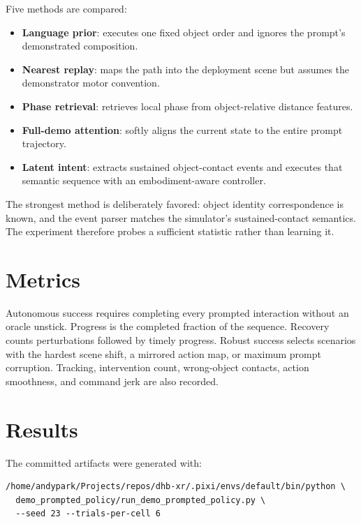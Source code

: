 \documentclass[11pt]{article}
\begin{document}
Five methods are compared:
\begin{itemize}[leftmargin=1.5em]
  \item \textbf{Language prior}: executes one fixed object order and ignores the prompt's demonstrated composition.
  \item \textbf{Nearest replay}: maps the path into the deployment scene but assumes the demonstrator motor convention.
  \item \textbf{Phase retrieval}: retrieves local phase from object-relative distance features.
  \item \textbf{Full-demo attention}: softly aligns the current state to the entire prompt trajectory.
  \item \textbf{Latent intent}: extracts sustained object-contact events and executes that semantic sequence with an embodiment-aware controller.
\end{itemize}

The strongest method is deliberately favored: object identity correspondence is known, and the event parser matches the simulator's sustained-contact semantics. The experiment therefore probes a sufficient statistic rather than learning it.

\section{Metrics}
Autonomous success requires completing every prompted interaction without an oracle unstick. Progress is the completed fraction of the sequence. Recovery counts perturbations followed by timely progress. Robust success selects scenarios with the hardest scene shift, a mirrored action map, or maximum prompt corruption. Tracking, intervention count, wrong-object contacts, action smoothness, and command jerk are also recorded.

\section{Results}
The committed artifacts were generated with:
\begin{verbatim}
/home/andypark/Projects/repos/dhb-xr/.pixi/envs/default/bin/python \
  demo_prompted_policy/run_demo_prompted_policy.py \
  --seed 23 --trials-per-cell 6
\end{verbatim}
\end{document}

